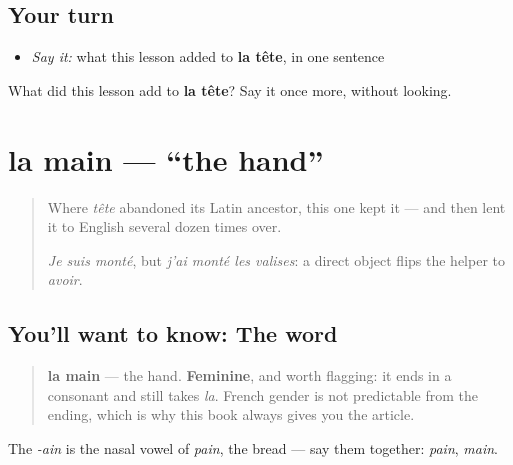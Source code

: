 \subsection*{Your turn}
\begin{itemize}
\raggedright
  \item \emph{Say it:} what this lesson added to \textbf{la tête}, in one sentence
\end{itemize}

\begin{tcolorbox}[breakable,colback=teal!4,colframe=teal!35!black,title={Before you move on}]
What did this lesson add to \textbf{la tête}? Say it once more, without looking.
\end{tcolorbox}
\section[la main]{la main — \textquotedblleft{}the hand\textquotedblright{}}

\label{lesson:FR-C17-main}



\begin{quote}
Where \emph{tête} abandoned its Latin ancestor, this one kept it — and then lent it to English several dozen times over.

\emph{Je suis monté}, but \emph{j'ai monté les valises}: a direct object flips the helper to \emph{avoir}.
\end{quote}

\subsection*{You'll want to know: The word}
\begin{quote}
\textbf{la main} — the hand. \textbf{Feminine}, and worth flagging: it ends in a consonant and still takes \emph{la}. French gender is not predictable from the ending, which is why this book always gives you the article.
\end{quote}

The \emph{-ain} is the nasal vowel of \emph{pain}, the bread — say them together: \emph{pain}, \emph{main}.

